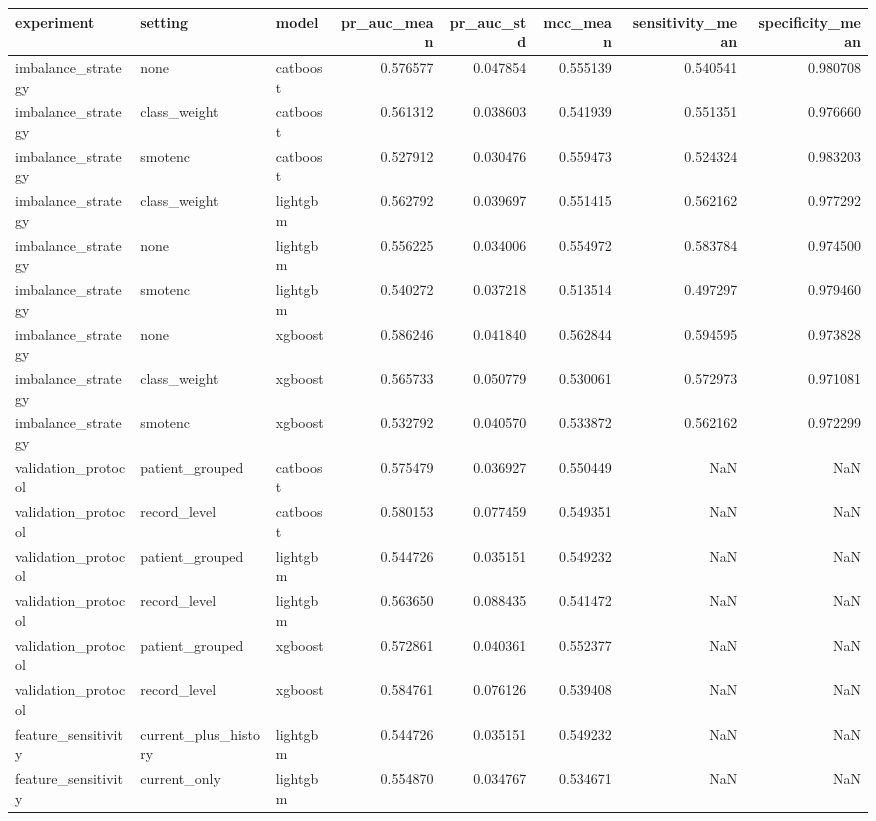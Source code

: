 \begin{tabular}{lllrrrrr}
\toprule
experiment & setting & model & pr\_auc\_mean & pr\_auc\_std & mcc\_mean & sensitivity\_mean & specificity\_mean \\
\midrule
imbalance\_strategy & none & catboost & 0.576577 & 0.047854 & 0.555139 & 0.540541 & 0.980708 \\
imbalance\_strategy & class\_weight & catboost & 0.561312 & 0.038603 & 0.541939 & 0.551351 & 0.976660 \\
imbalance\_strategy & smotenc & catboost & 0.527912 & 0.030476 & 0.559473 & 0.524324 & 0.983203 \\
imbalance\_strategy & class\_weight & lightgbm & 0.562792 & 0.039697 & 0.551415 & 0.562162 & 0.977292 \\
imbalance\_strategy & none & lightgbm & 0.556225 & 0.034006 & 0.554972 & 0.583784 & 0.974500 \\
imbalance\_strategy & smotenc & lightgbm & 0.540272 & 0.037218 & 0.513514 & 0.497297 & 0.979460 \\
imbalance\_strategy & none & xgboost & 0.586246 & 0.041840 & 0.562844 & 0.594595 & 0.973828 \\
imbalance\_strategy & class\_weight & xgboost & 0.565733 & 0.050779 & 0.530061 & 0.572973 & 0.971081 \\
imbalance\_strategy & smotenc & xgboost & 0.532792 & 0.040570 & 0.533872 & 0.562162 & 0.972299 \\
validation\_protocol & patient\_grouped & catboost & 0.575479 & 0.036927 & 0.550449 & NaN & NaN \\
validation\_protocol & record\_level & catboost & 0.580153 & 0.077459 & 0.549351 & NaN & NaN \\
validation\_protocol & patient\_grouped & lightgbm & 0.544726 & 0.035151 & 0.549232 & NaN & NaN \\
validation\_protocol & record\_level & lightgbm & 0.563650 & 0.088435 & 0.541472 & NaN & NaN \\
validation\_protocol & patient\_grouped & xgboost & 0.572861 & 0.040361 & 0.552377 & NaN & NaN \\
validation\_protocol & record\_level & xgboost & 0.584761 & 0.076126 & 0.539408 & NaN & NaN \\
feature\_sensitivity & current\_plus\_history & lightgbm & 0.544726 & 0.035151 & 0.549232 & NaN & NaN \\
feature\_sensitivity & current\_only & lightgbm & 0.554870 & 0.034767 & 0.534671 & NaN & NaN \\

\end{tabular}
